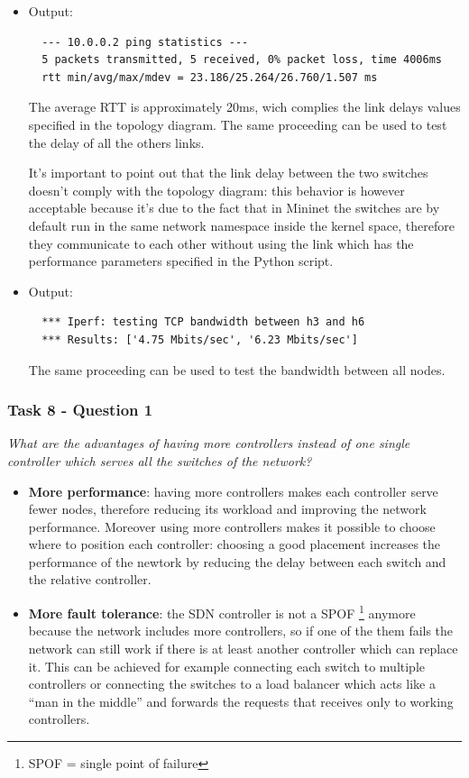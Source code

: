 \begin{itemize}
  \item {}

  Output:
  \begin{lstlisting}
  --- 10.0.0.2 ping statistics ---
  5 packets transmitted, 5 received, 0% packet loss, time 4006ms
  rtt min/avg/max/mdev = 23.186/25.264/26.760/1.507 ms
  \end{lstlisting}
  The average RTT is approximately 20ms, wich complies the link delays values
  specified in the topology diagram. The same proceeding can be used to test the
  delay of all the others links.

  It's important to point out that the link delay between the two switches doesn't
  comply with the topology diagram: this behavior is however acceptable because it's due to
  the fact that in Mininet the switches are by default run in the same network
  namespace inside the kernel space, therefore they communicate to each other
  without using the link which has the performance parameters specified
  in the Python script.

  \item {}

  Output:
  \begin{lstlisting}
  *** Iperf: testing TCP bandwidth between h3 and h6
  *** Results: ['4.75 Mbits/sec', '6.23 Mbits/sec']
  \end{lstlisting}

  The same proceeding can be used to test the bandwidth between all nodes.
\end{itemize}



\subsubsection*{Task 8 - Question 1}
\textit{What are the advantages of having more controllers instead of
one single controller which serves all the switches of the network?}
\begin{itemize}
  \item \textbf{More performance}:  having more controllers makes each controller serve fewer
  nodes, therefore reducing its workload and improving the network performance.
  Moreover using more controllers makes it possible to choose where to position
  each controller: choosing a good placement increases the performance
  of the newtork by reducing the delay between each switch and the relative
  controller.
  \item \textbf{More fault tolerance}: the SDN controller is not a SPOF \footnote{SPOF = single point of failure}
  anymore because the network includes more controllers, so if one of the them
  fails the network can still work if there is at least another controller which can replace it.
  This can be achieved for example connecting each switch to multiple controllers
  or connecting the switches to a load balancer which acts like a ``man in the middle'' and
  forwards the requests that receives only to working controllers.
\end{itemize}


